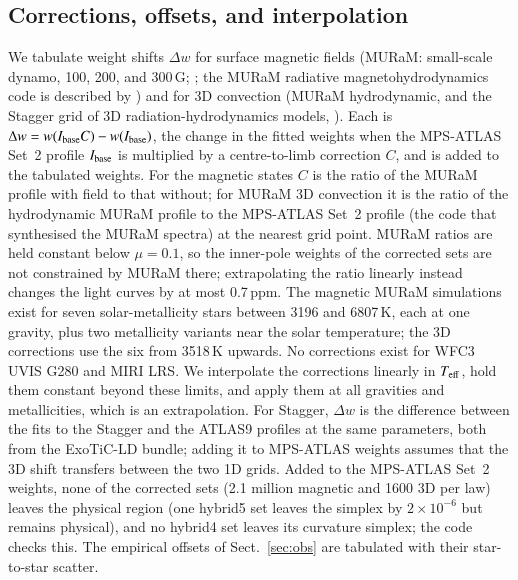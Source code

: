 \documentclass{aa}
\newcommand{\ppm}{\,\textrm{ppm}}
\newcommand{\teff}{T_{\rm eff}}
\begin{document}
\subsection{Corrections, offsets, and interpolation}
We tabulate weight shifts $\Delta w$ for surface magnetic fields (MURaM:
small-scale dynamo, 100, 200, and 300\,G; \citealt{kostogryz2026}; the
MURaM radiative magnetohydrodynamics code is described by \citealt{voegler2005})
and for 3D convection (MURaM hydrodynamic, and the Stagger grid of 3D
radiation-hydrodynamics models, \citealt{magic2015}). Each is $\Delta w=w(I_{\rm base}C)-w(I_{\rm
base})$, the change in the fitted weights when the MPS-ATLAS Set~2 profile
$I_{\rm base}$ is multiplied by a centre-to-limb correction $C$, and is added
to the tabulated weights. For the magnetic states $C$ is the ratio of the
MURaM profile with field to that without; for MURaM 3D convection it is the
ratio of the hydrodynamic MURaM profile to the MPS-ATLAS Set~2 profile (the
code that synthesised the MURaM spectra) at the nearest grid point. MURaM
ratios are held constant below $\mu=0.1$, so the inner-pole weights of the
corrected sets are not constrained by MURaM there; extrapolating the ratio
linearly instead changes the light curves by at most 0.7\ppm. The magnetic
MURaM simulations exist for seven solar-metallicity stars between 3196 and
6807\,K, each at one gravity, plus two metallicity variants near the solar
temperature; the 3D corrections use the six from 3518\,K upwards. No
corrections exist for WFC3 UVIS G280
and MIRI LRS. We interpolate the
corrections linearly in $\teff$, hold them constant beyond these limits, and
apply them at all gravities and metallicities, which is an extrapolation. For
Stagger, $\Delta w$ is the difference between the fits to the Stagger and the
ATLAS9 \citep{castelli2003} profiles at the same parameters, both from the
ExoTiC-LD bundle; adding it to MPS-ATLAS weights assumes that the 3D shift
transfers between the two 1D grids. Added to the MPS-ATLAS Set~2
weights, none of the corrected sets (2.1 million magnetic and 1600 3D per
law) leaves the physical region (one hybrid5 set leaves the simplex by $2\times10^{-6}$ but
remains physical), and no hybrid4 set leaves its curvature simplex; the
code checks this. The empirical offsets of Sect.~\ref{sec:obs} are tabulated with their
star-to-star scatter.
\end{document}

